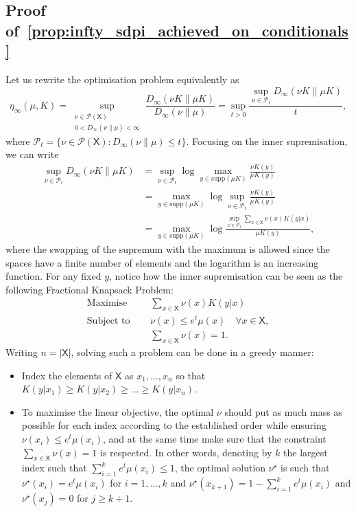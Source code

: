 \documentclass[conference,letterpaper]{IEEEtran}
\def \X{\mathsf X}
\def \calP{\mathcal P}
\def \supp {\mathrm{supp}}
\begin{document}
\subsection{Proof of~\cref{prop:infty_sdpi_achieved_on_conditionals}}\label{appendix:proof_infty_sdpi_achieved_on_conditionals}\noindent
    Let us rewrite the optimisation problem equivalently as
    \begin{equation*}
        \eta_\infty(\mu, K) = \sup_{\substack{\nu\in\calP(\X)\\0<D_\infty(\nu\|\mu)<\infty}}\frac{D_\infty(\nu K\|\mu K)}{D_\infty(\nu\|\mu)} = \sup_{t>0}\frac{\sup_{\nu\in\calP_t} D_\infty(\nu K\|\mu K)}{t},
    \end{equation*}
    where $\calP_t=\{\nu\in\calP(\X): D_\infty(\nu\|\mu)\leq t\}$. Focusing on the inner supremisation, we can write
    \begin{align*}
        \sup_{\nu\in\calP_t} D_\infty(\nu K\|\mu K)
        &= \sup_{\nu\in\calP_t} \log\max_{y\in\supp(\mu K) }\frac{\nu K(y)}{\mu K(y)}\\
        &= \max_{y\in\supp(\mu K) }\log\sup_{\nu\in\calP_t}\frac{\nu K(y)}{\mu K(y)}\\
        &= \max_{y\in\supp(\mu K) }\log\frac{\sup_{\nu\in\calP_t}\sum_{x\in\X} \nu(x)K(y|x)}{\mu K(y)},
    \end{align*}
    where the swapping of the supremum with the maximum is allowed since the spaces have a finite number of elements and the logarithm is an increasing function. For any fixed $y$, notice how the inner supremisation can be seen as the following Fractional Knapsack Problem:
    \begin{align*}
        \text{Maximise }&\quad\sum_{x\in\X}  \nu(x)K(y|x)\\
        \text{Subject to }&\quad \nu(x)\leq e^t\mu(x)\quad \forall x\in\X,\\&\quad\sum_{x\in\X}\nu(x)=1.
    \end{align*}
    Writing $n=|\X|$, solving such a problem can be done in a greedy manner:
    \begin{itemize}
        \item Index the elements of $\X$ as $x_1, \dots,x_n$ so that $K(y|x_1)\geq K(y|x_2)\geq\dots \geq K(y|x_n)$.
        \item To maximise the linear objective, the optimal $\nu$ should put as much mass as possible for each index according to the established order while ensuring $\nu(x_i)\leq e^t\mu(x_i)$, and at the same time make sure that the constraint $\sum_{x\in\X}\nu(x)=1$ is respected. In other words, denoting by $k$ the largest index such that $\sum_{i=1}^k e^t\mu(x_i) \leq 1$, the optimal solution $\nu^\star$ is such that $\nu^\star(x_i)=e^t\mu(x_i)$ for $i=1,\dots,k$ and $\nu^\star(x_{k+1}) = 1-\sum_{i=1}^k e^t\mu(x_i)$ and $\nu^\star(x_j)=0$ for $j\geq k+1$.
    \end{itemize}
\end{document}
